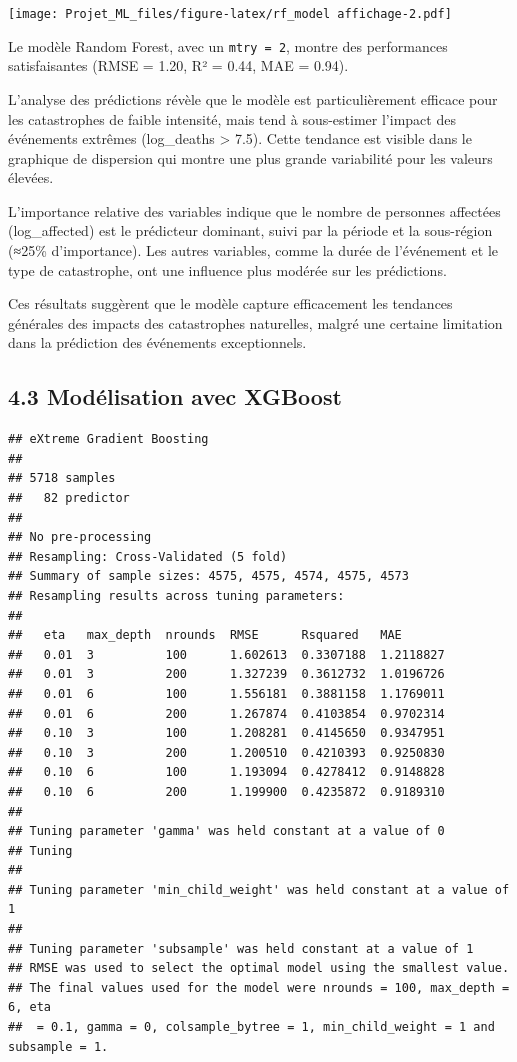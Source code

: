 \documentclass[
]{article}
\begin{document}
\texttt{[image: Projet\_ML\_files/figure-latex/rf\_model affichage-2.pdf]}

Le modèle Random Forest, avec un \texttt{mtry\ =\ 2}, montre des
performances satisfaisantes (RMSE = 1.20, R² = 0.44, MAE = 0.94).

L'analyse des prédictions révèle que le modèle est particulièrement
efficace pour les catastrophes de faible intensité, mais tend à
sous-estimer l'impact des événements extrêmes (log\_deaths
\textgreater{} 7.5). Cette tendance est visible dans le graphique de
dispersion qui montre une plus grande variabilité pour les valeurs
élevées.

L'importance relative des variables indique que le nombre de personnes
affectées (log\_affected) est le prédicteur dominant, suivi par la
période et la sous-région (≈25\% d'importance). Les autres variables,
comme la durée de l'événement et le type de catastrophe, ont une
influence plus modérée sur les prédictions.

Ces résultats suggèrent que le modèle capture efficacement les tendances
générales des impacts des catastrophes naturelles, malgré une certaine
limitation dans la prédiction des événements exceptionnels.

\subsection{4.3 Modélisation avec
XGBoost}\label{moduxe9lisation-avec-xgboost}

\begin{verbatim}
## eXtreme Gradient Boosting 
## 
## 5718 samples
##   82 predictor
## 
## No pre-processing
## Resampling: Cross-Validated (5 fold) 
## Summary of sample sizes: 4575, 4575, 4574, 4575, 4573 
## Resampling results across tuning parameters:
## 
##   eta   max_depth  nrounds  RMSE      Rsquared   MAE      
##   0.01  3          100      1.602613  0.3307188  1.2118827
##   0.01  3          200      1.327239  0.3612732  1.0196726
##   0.01  6          100      1.556181  0.3881158  1.1769011
##   0.01  6          200      1.267874  0.4103854  0.9702314
##   0.10  3          100      1.208281  0.4145650  0.9347951
##   0.10  3          200      1.200510  0.4210393  0.9250830
##   0.10  6          100      1.193094  0.4278412  0.9148828
##   0.10  6          200      1.199900  0.4235872  0.9189310
## 
## Tuning parameter 'gamma' was held constant at a value of 0
## Tuning
## 
## Tuning parameter 'min_child_weight' was held constant at a value of 1
## 
## Tuning parameter 'subsample' was held constant at a value of 1
## RMSE was used to select the optimal model using the smallest value.
## The final values used for the model were nrounds = 100, max_depth = 6, eta
##  = 0.1, gamma = 0, colsample_bytree = 1, min_child_weight = 1 and subsample = 1.
\end{verbatim}
\end{document}
